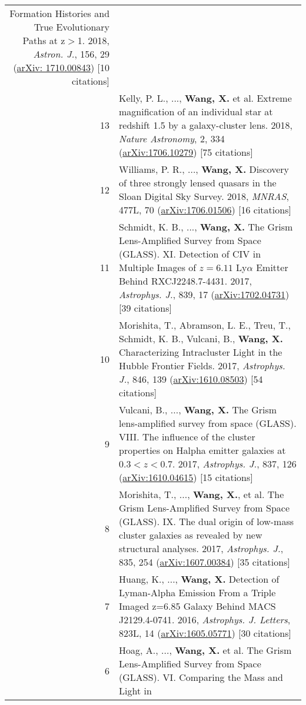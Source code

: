 \documentclass[letterpaper,12pt]{article}
\begin{document}
\begin{longtable}{rp{5.8in}}
    Formation Histories and True Evolutionary Paths at z$>$1. 2018, \textit{Astron. J.}, 156, 29 (\href{https://arxiv.org/abs/1710.00843}{arXiv:
    1710.00843}) [10 citations]  \\
13  &   Kelly, P. L., ..., \textbf{Wang, X.} et al. Extreme magnification of an individual star at redshift 1.5 by a galaxy-cluster lens. 2018, 
    \textit{Nature Astronomy}, 2, 334 (\href{https://arxiv.org/abs/1706.10279}{arXiv:1706.10279}) [75 citations]  \\
12  &   Williams, P. R., ..., \textbf{Wang, X.} Discovery of three strongly lensed quasars in the Sloan Digital Sky Survey. 2018, \textit{MNRAS}, 477L, 
    70 (\href{https://arxiv.org/abs/1706.01506}{arXiv:1706.01506}) [16 citations]  \\
11  &   Schmidt, K. B., ..., \textbf{Wang, X.} The Grism Lens-Amplified Survey from Space (GLASS). XI. Detection of CIV in Multiple Images of $z=6.11$ 
    Ly$\alpha$ Emitter Behind RXCJ2248.7-4431. 2017, \textit{Astrophys. J.}, 839, 17 
    (\href{https://arxiv.org/abs/1702.04731}{arXiv:1702.04731}) [39 citations] \\
10  &   Morishita, T., Abramson, L. E., Treu, T., Schmidt, K. B., Vulcani, B., \textbf{Wang, X.} Characterizing Intracluster Light in the Hubble 
    Frontier Fields. 2017, \textit{Astrophys. J.}, 846, 139 (\href{https://arxiv.org/abs/1610.08503}{arXiv:1610.08503}) [54 citations] \\
9   &   Vulcani, B., ..., \textbf{Wang, X.} The Grism lens-amplified survey from space (GLASS). VIII. The influence of the cluster properties on 
    Halpha emitter galaxies at $0.3<z<0.7$. 2017, \textit{Astrophys. J.}, 837, 126 (\href{https://arxiv.org/abs/1610.04615}{arXiv:1610.04615}) [15 citations]  \\
8   &   Morishita, T., ..., \textbf{Wang, X.}, et al. The Grism Lens-Amplified Survey from Space (GLASS). IX. The dual origin of low-mass cluster 
    galaxies as revealed by new structural analyses. 2017, \textit{Astrophys. J.}, 835, 254 (\href{https://arxiv.org/abs/1607.00384}{arXiv:1607.00384}) 
    [35 citations]  \\
7   &   Huang, K., ..., \textbf{Wang, X.} Detection of Lyman-Alpha Emission From a Triple Imaged z=6.85 Galaxy Behind MACS J2129.4-0741. 2016, 
    \textit{Astrophys. J. Letters}, 823L, 14 (\href{https://arxiv.org/abs/1605.05771}{arXiv:1605.05771}) [30 citations]   \\
6   &   Hoag, A., ..., \textbf{Wang, X.} et al. The Grism Lens-Amplified Survey from Space (GLASS). VI. Comparing the Mass and Light in 

\end{longtable}
\end{document}

